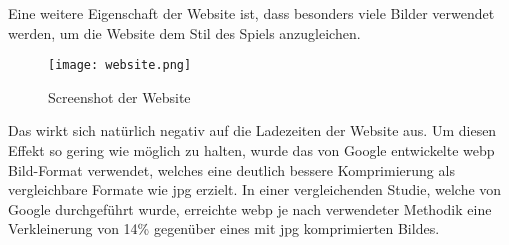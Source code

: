 Eine weitere Eigenschaft der \FF Website ist, dass besonders viele Bilder verwendet werden, um die Website dem Stil des
Spiels anzugleichen.

\begin{figure}[H]
    \centering
    \texttt{[image: website.png]}
    \caption{Screenshot der Website}
\end{figure}

Das wirkt sich natürlich negativ auf die Ladezeiten der Website aus.
Um diesen Effekt so gering wie möglich zu halten, wurde das von Google entwickelte webp Bild-Format verwendet, welches
eine deutlich bessere Komprimierung als vergleichbare Formate wie \zB jpg erzielt.
In einer vergleichenden Studie, welche von Google durchgeführt wurde, erreichte webp je nach verwendeter Methodik eine
Verkleinerung von 14\% gegenüber eines mit jpg komprimierten Bildes.\cite{googleWebpStudie}

\renewcommand{\kapitelautor}{}
